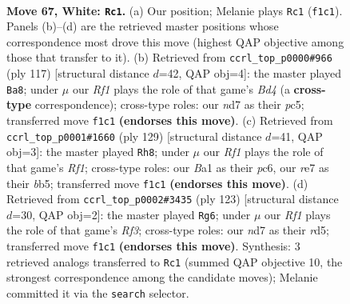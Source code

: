 \documentclass[11pt]{article}
\begin{document}
\clearpage

\begin{figure}[p]\centering
\begin{subfigure}{0.46\textwidth}\centering
\resizebox{\linewidth}{!}{%
\newchessgame
\chessboard[
  setfen={7k/3nr3/6P1/8/p1p5/P1P4p/2P4P/B4R1K w - - 23 67},
  showmover=false,
  pgfstyle=straightmove, color=movearrow, markmove={f1-c1}
]}
\caption{}
\end{subfigure}\hfill
\begin{subfigure}{0.46\textwidth}\centering
\resizebox{\linewidth}{!}{%
\newchessgame
\chessboard[
  setfen={8/4pk2/8/1pPb1Pp1/p5P1/P7/4K3/B7 b - - 37 59},
  showmover=false,
  pgfstyle=straightmove, color=movearrow, markmove={d5-a8}
]}
\caption{}
\end{subfigure}
\\[4pt]
\begin{subfigure}{0.46\textwidth}\centering
\resizebox{\linewidth}{!}{%
\newchessgame
\chessboard[
  setfen={3k1r2/8/1PP3p1/pB1p1p2/3P1PpP/8/5K2/8 b - - 8 65},
  showmover=false,
  pgfstyle=straightmove, color=movearrow, markmove={f8-h8}
]}
\caption{}
\end{subfigure}\hfill
\begin{subfigure}{0.46\textwidth}\centering
\resizebox{\linewidth}{!}{%
\newchessgame
\chessboard[
  setfen={6k1/6b1/p4r2/Pp1R4/1P3p2/5p2/2R4K/8 b - - 0 62},
  showmover=false,
  pgfstyle=straightmove, color=movearrow, markmove={f6-g6}
]}
\caption{}
\end{subfigure}
\caption{\textbf{Move 67, White: \texttt{Rc1}.} (a) Our position; Melanie plays \texttt{Rc1} (\texttt{f1c1}). Panels (b)--(d) are the retrieved master positions whose correspondence most drove this move (highest QAP objective among those that transfer to it). (b) Retrieved from \texttt{ccrl\_top\_p0000\#966} (ply 117) [structural distance $d$=42, QAP obj=4]: the master played \texttt{Ba8}; under $\mu$ our \emph{Rf1} plays the role of that game's \emph{Bd4} (a \textbf{cross-type} correspondence); cross-type roles: our \emph{n}d7 as their \emph{p}c5; transferred move \texttt{f1c1} \textbf{(endorses this move)}. (c) Retrieved from \texttt{ccrl\_top\_p0001\#1660} (ply 129) [structural distance $d$=41, QAP obj=3]: the master played \texttt{Rh8}; under $\mu$ our \emph{Rf1} plays the role of that game's \emph{Rf1}; cross-type roles: our \emph{B}a1 as their \emph{p}c6, our \emph{r}e7 as their \emph{b}b5; transferred move \texttt{f1c1} \textbf{(endorses this move)}. (d) Retrieved from \texttt{ccrl\_top\_p0002\#3435} (ply 123) [structural distance $d$=30, QAP obj=2]: the master played \texttt{Rg6}; under $\mu$ our \emph{Rf1} plays the role of that game's \emph{Rf3}; cross-type roles: our \emph{n}d7 as their \emph{r}d5; transferred move \texttt{f1c1} \textbf{(endorses this move)}. Synthesis: 3 retrieved analogs transferred to \texttt{Rc1} (summed QAP objective 10, the strongest correspondence among the candidate moves); Melanie committed it via the \texttt{search} selector.}
\label{fig:thought-m132}
\end{figure}
\end{document}
